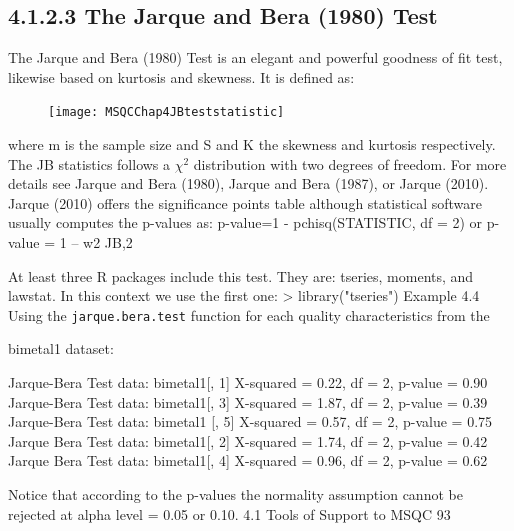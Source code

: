 \documentclass[]{beamer}
\begin{document}
\subsection{4.1.2.3 The Jarque and Bera (1980) Test}
\begin{frame}[fragile]


The Jarque and Bera (1980) Test is an elegant and powerful goodness of fit test,
likewise based on kurtosis and skewness. It is defined as:
\begin{figure}
\centering
\texttt{[image: MSQCChap4JBteststatistic]}
\caption{}
\label{fig:MSQCChap4JBteststatistic}
\end{figure}
\end{frame}
\begin{frame}[fragile]
where m is the sample size and S and K the skewness and kurtosis respectively.
The JB statistics follows a $\chi^2$ distribution with two degrees of freedom.
For more details see Jarque and Bera (1980), Jarque and Bera (1987), or Jarque
(2010).
Jarque (2010) offers the significance points table although statistical software
usually computes the p-values as:
p-value=1 - pchisq(STATISTIC, df = 2) or p-value = 1 – w2
JB,2
\end{frame}
\begin{frame}[fragile]
At least three R packages include this test. They are: tseries, moments, and lawstat. In this context we use the first one:
> library("tseries")
Example 4.4
Using the \texttt{jarque.bera.test} function for each quality characteristics from the

bimetal1 dataset:

\end{frame}
\begin{frame}[fragile]
Jarque-Bera Test
data: bimetal1[, 1]
X-squared = 0.22,
df = 2, p-value = 0.90
Jarque-Bera Test
data: bimetal1[, 3]
X-squared = 1.87,
df = 2, p-value = 0.39
Jarque-Bera Test
data: bimetal1
[, 5]
X-squared = 0.57,
df = 2, p-value = 0.75
Jarque Bera Test
data: bimetal1[, 2]
X-squared = 1.74, df = 2,
p-value = 0.42
Jarque Bera Test
data: bimetal1[, 4]
X-squared = 0.96, df = 2,
p-value = 0.62
\end{frame}
\begin{frame}[fragile]
Notice that according to the p-values the normality assumption cannot be
rejected at alpha level = 0.05 or 0.10.
4.1 Tools of Support to MSQC 93
\end{frame}
\end{document}

